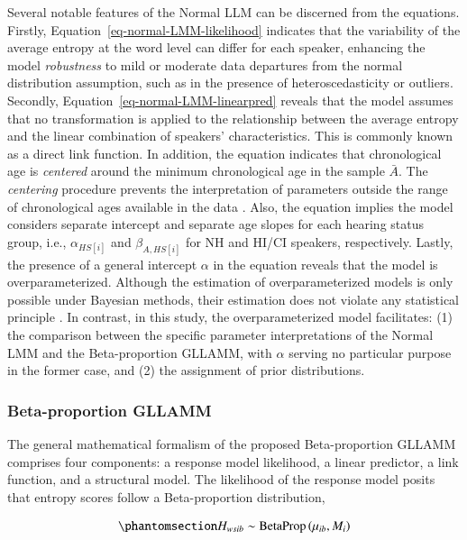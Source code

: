\documentclass[
  authoryear,
  preprint,
  1p]{elsarticle}
\begin{document}
Several notable features of the Normal LLM can be discerned from the
equations. Firstly, Equation~\ref{eq-normal-LMM-likelihood} indicates
that the variability of the average entropy at the word level can differ
for each speaker, enhancing the model \emph{robustness} to mild or
moderate data departures from the normal distribution assumption, such
as in the presence of heteroscedasticity or outliers. Secondly,
Equation~\ref{eq-normal-LMM-linearpred} reveals that the model assumes
that no transformation is applied to the relationship between the
average entropy and the linear combination of speakers' characteristics.
This is commonly known as a direct link function. In addition, the
equation indicates that chronological age is \emph{centered} around the
minimum chronological age in the sample \(\bar{A}\). The
\emph{centering} procedure prevents the interpretation of parameters
outside the range of chronological ages available in the data
\citep{Everitt_et_al_2010}. Also, the equation implies the model
considers separate intercept and separate age slopes for each hearing
status group, i.e., \(\alpha_{HS[i]}\) and \(\beta_{A, HS[i]}\) for NH
and HI/CI speakers, respectively. Lastly, the presence of a general
intercept \(\alpha\) in the equation reveals that the model is
overparameterized. Although the estimation of overparameterized models
is only possible under Bayesian methods, their estimation does not
violate any statistical principle \citep[345]{McElreath_2020}. In
contrast, in this study, the overparameterized model facilitates: (1)
the comparison between the specific parameter interpretations of the
Normal LMM and the Beta-proportion GLLAMM, with \(\alpha\) serving no
particular purpose in the former case, and (2) the assignment of prior
distributions.

\subsubsection{Beta-proportion GLLAMM}\label{sec-M-SM-BGLLAMM}

The general mathematical formalism of the proposed Beta-proportion
GLLAMM comprises four components: a response model likelihood, a linear
predictor, a link function, and a structural model. The likelihood of
the response model posits that entropy scores follow a Beta-proportion
distribution,

\begin{equation}\phantomsection\label{eq-beta-GLLAMM-likelihood}{
H_{wsib} \sim \text{BetaProp} \left( \mu_{ib}, M_{i} \right)
}\end{equation}
\end{document}
